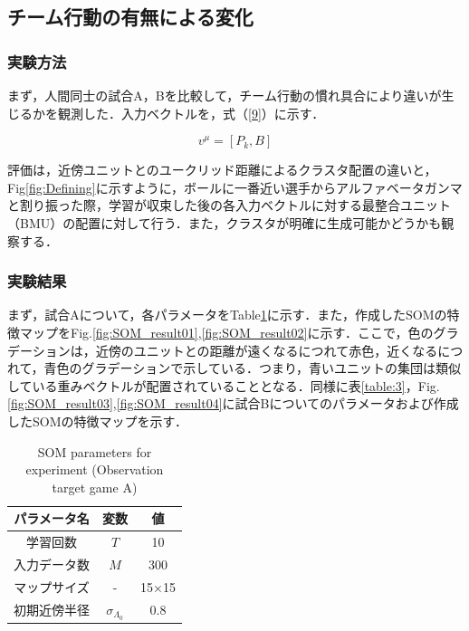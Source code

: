 \clearpage%

\subsection{チーム行動の有無による変化}
\subsubsection{実験方法}
まず，人間同士の試合A，Bを比較して，チーム行動の慣れ具合により違いが生じるかを観測した．入力ベクトルを，式（\ref{9}）に示す．

\begin{equation}
\label{9}
v^{\mu} = [P_k, B]
\end{equation}

評価は，近傍ユニットとのユークリッド距離によるクラスタ配置の違いと，Fig\ref{fig:Defining}に示すように，ボールに一番近い選手からアルファベータガンマと割り振った際，学習が収束した後の各入力ベクトルに対する最整合ユニット（BMU）の配置に対して行う．また，クラスタが明確に生成可能かどうかも観察する．

\subsubsection{実験結果}
まず，試合Aについて，各パラメータをTable\ref{table:2}に示す．また，作成したSOMの特徴マップをFig.\ref{fig:SOM_result01},\ref{fig:SOM_result02}に示す．ここで，色のグラデーションは，近傍のユニットとの距離が遠くなるにつれて赤色，近くなるにつれて，青色のグラデーションで示している．つまり，青いユニットの集団は類似している重みベクトルが配置されていることとなる．同様に表\ref{table:3}，Fig.\ref{fig:SOM_result03},\ref{fig:SOM_result04}に試合Bについてのパラメータおよび作成したSOMの特徴マップを示す．

\begin{table}[htb]
	\begin{center}
	\caption{SOM parameters for experiment (Observation target game A)}
	\begin{tabular}{|c|c|c|}\hline
		\label{table:2}
	 	パラメータ名 & 変数 & 値  \\ \hline \hline
	 	学習回数 & $T$ & 10  \\
   	 	入力データ数 & $M$ & 300 \\
		マップサイズ & - & 15×15 \\
   		初期近傍半径 & $\sigma_{\Lambda_0}$ & 0.8 \\ \hline
	\end{tabular}
	\end{center}
\end{table}

